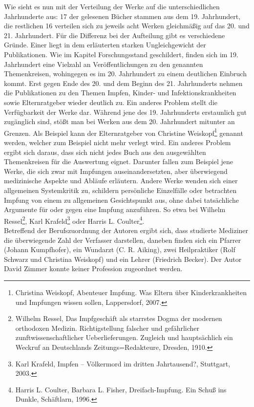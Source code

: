 \documentclass[
    a4paper,
    12pt,
    hyphens,
    chapterprefix=true,
    headheight=33pt,
    footheight=29pt,
    headings=optiontohead,
]{scrartcl}
\begin{document}
Wie sieht es nun mit der Verteilung der Werke auf die unterschiedlichen Jahrhunderte aus: 17 der gelesenen Bücher stammen aus dem 19. Jahrhundert, die restlichen 16 verteilen sich zu jeweils acht Werken gleichmäßig auf das 20. und 21. Jahrhundert. Für die Differenz bei der Aufteilung gibt es verschiedene Gründe. Einer liegt in dem erläuterten starken Ungleichgewicht der Publikationen. Wie im Kapitel Forschungsstand geschildert, finden sich im 19. Jahrhundert eine Vielzahl an Veröffentlichungen zu den genannten Themenkreisen, wohingegen es im 20. Jahrhundert zu einem deutlichen Einbruch kommt. Erst gegen Ende des 20. und dem Beginn des 21. Jahrhunderts nehmen die Publikationen zu den Themen Impfen, Kinder- und Infektionskrankheiten sowie Elternratgeber wieder deutlich zu. Ein anderes Problem stellt die Verfügbarkeit der Werke dar. Während jene des 19. Jahrhunderts erstaunlich gut zugänglich sind, stößt man bei Werken aus dem 20. Jahrhundert mitunter an Grenzen. Als Beispiel kann der Elternratgeber von Christine Weiskopf\footnote{Christina Weiskopf, Abenteuer Impfung. Was Eltern über Kinderkrankheiten und Impfungen wissen sollen, Lappersdorf, 2007.} genannt werden, welcher zum Beispiel nicht mehr verlegt wird. Ein anderes Problem ergibt sich daraus, dass sich nicht jedes Buch aus den ausgewählten Themenkreisen für die Auswertung eignet. Darunter fallen zum Beispiel jene Werke, die sich zwar mit Impfungen auseinandersetzten, aber überwiegend medizinische Aspekte und Abläufe erläutern. Andere Werke wenden sich einer allgemeinen Systemkritik zu, schildern persönliche Einzelfälle oder betrachten Impfung von einem zu allgemeinen Gesichtspunkt aus, ohne dabei tatsächliche Argumente für oder gegen eine Impfung anzuführen. So etwa bei Wilhelm Ressel\footnote{Wilhelm Ressel, Das Impfgeschäft als starrstes Dogma der modernen orthodoxen Medizin. Richtigstellung falscher und gefährlicher zunftwissenschaftlicher Ueberlieferungen. Zugleich und hauptsächlich ein Weckruf an Deutschlands Zeitungs=Redakteure, Dresden, 1910.}, Karl Krafeld\footnote{Karl Krafeld, Impfen -- Völkermord im dritten Jahrtausend?, Stuttgart, 2003.} oder Harris L. Coulter\footnote{Harris L. Coulter, Barbara L. Fisher, Dreifach-Impfung. Ein Schuß ins Dunkle, Schäftlarn, 1996.}.\\
Betreffend der Berufszuordnung der Autoren ergibt sich, dass studierte Mediziner die überwiegende Zahl der Verfasser darstellen, daneben finden sich ein Pfarrer (Johann Kumpfhofer), ein Wundarzt (C. R. Aiking), zwei Heilpraktiker (Rolf Schwarz und Christina Weiskopf) und ein Lehrer (Friedrich Becker). Der Autor David Zimmer konnte keiner Profession zugeordnet werden.
\end{document}
